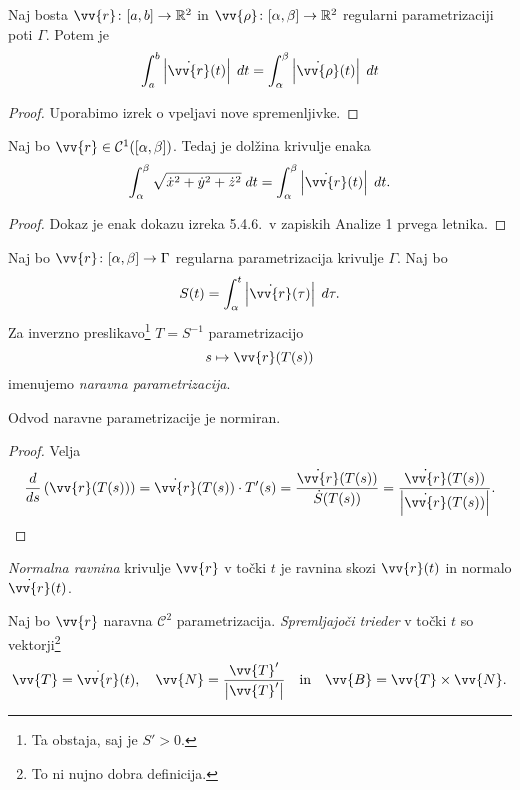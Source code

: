 \begin{trditev}
Naj bosta $\vv{r}\colon[a,b]\to\R^2$ in
$\vv{\rho}\colon[\alpha,\beta]\to\R^2$ regularni parametrizaciji
poti $\Gamma$. Potem je
\[
\int_a^b \abs{\dot{\vv{r}}(t)}\;dt =
\int_\alpha^\beta \abs{\dot{\vv{\rho}}(t)}\;dt
\]
\end{trditev}

\begin{proof}
Uporabimo izrek o vpeljavi nove spremenljivke.
\end{proof}

\begin{trditev}
Naj bo $\vv{r} \in \mathcal{C}^1([\alpha, \beta])$. Tedaj je
dolžina krivulje enaka
\[
\int_\alpha^\beta \sqrt{\dot{x}^2 + \dot{y}^2 + \dot{z}^2}\;dt =
\int_\alpha^\beta \abs{\dot{\vv{r}}(t)}\;dt.
\]
\end{trditev}

\begin{proof}
Dokaz je enak dokazu izreka 5.4.6.\ v zapiskih Analize 1 prvega
letnika.
\end{proof}

\begin{definicija}
Naj bo $\vv{r} \colon [\alpha, \beta] \to \Gamma$ regularna
parametrizacija krivulje $\Gamma$. Naj bo
\[
S(t) = \int_\alpha^t \abs{\dot{\vv{r}}(\tau)}\;d\tau.
\]
Za inverzno preslikavo\footnote{Ta obstaja, saj je $S' > 0$.}
$T=S^{-1}$ parametrizacijo
\[
s \mapsto \vv{r}(T(s))
\]
imenujemo
\emph{naravna parametrizacija}.
\end{definicija}

\begin{trditev}
Odvod naravne parametrizacije je normiran.
\end{trditev}

\begin{proof}
Velja
\[
\frac{d}{ds} \left(\vv{r}(T(s))\right) =
\dot{\vv{r}}(T(s)) \cdot T'(s) =
\frac{\dot{\vv{r}}(T(s))}{\dot{S}(T(s))} =
\frac{\dot{\vv{r}}(T(s))}{\abs{\dot{\vv{r}}(T(s))}}. \qedhere
\]
\end{proof}

\begin{definicija}
\emph{Normalna ravnina} krivulje
$\vv{r}$ v točki $t$ je ravnina skozi $\vv{r}(t)$ in normalo
$\dot{\vv{r}}(t)$.
\end{definicija}

\begin{definicija}
Naj bo $\vv{r}$ naravna $\mathcal{C}^2$ parametrizacija.
\emph{Spremljajoči trieder} v točki $t$ so vektorji\footnote{To ni
nujno dobra definicija.}
\[
\vv{T} = \dot{\vv{r}}(t),
\quad
\vv{N} = \frac{\vv{T}'}{\abs{\vv{T}'}}
\quad \text{in} \quad
\vv{B} = \vv{T} \times \vv{N}.
\]
\end{definicija}

